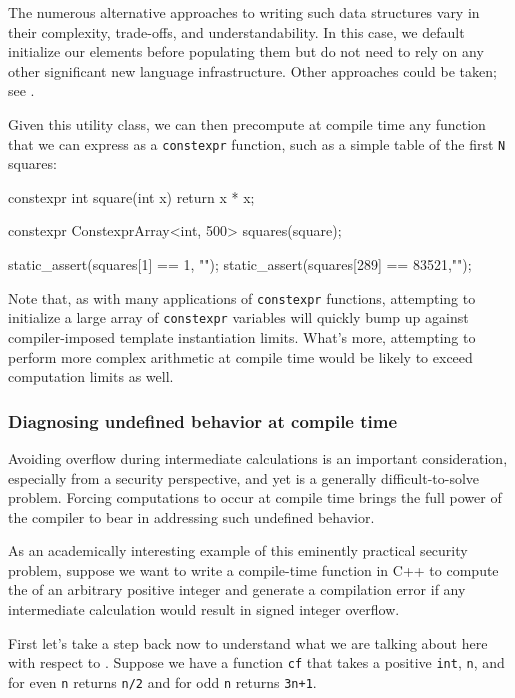 \noindent The numerous alternative approaches to writing such data structures
vary in their complexity, trade-offs, and understandability. In this
case, we default initialize our elements before populating them but do
not need to rely on any other significant new language infrastructure.
Other approaches could be taken; see .

Given this utility class, we can then precompute at compile time any
function that we can express as a \lstinline!constexpr! function, such as a
simple table of the first \lstinline!N! squares:

\begin{emcppslisting}[emcppsbatch=e3]
constexpr int square(int x) { return x * x; }

constexpr ConstexprArray<int, 500> squares(square);

static_assert(squares[1]   == 1,    "");
static_assert(squares[289] == 83521,"");
\end{emcppslisting}
    
\noindent Note that, as with many applications of \lstinline!constexpr! functions,
attempting to initialize a large array of \lstinline!constexpr! variables
will quickly bump up against compiler-imposed template instantiation
limits. What's more, attempting to perform more complex arithmetic at
compile time would be likely to exceed computation limits as well.

\subsubsection[Diagnosing undefined behavior at compile time]{Diagnosing undefined behavior at compile time}\label{diagnosing-undefined-behavior-at-compile-time}

Avoiding overflow during intermediate calculations is an important
consideration, especially from a security perspective, and yet is a
generally difficult-to-solve problem. Forcing computations to occur at
compile time brings the full power of the compiler to bear in addressing
such undefined behavior.

As an academically interesting example of this eminently practical
security problem, suppose we want to write a compile-time function in
C++ to compute the  of an arbitrary positive
integer and generate a compilation error if any intermediate calculation
would result in signed integer overflow.

First let's take a step back now to understand what we are talking about
here with respect to . Suppose we have a function
\lstinline!cf! that takes a positive \lstinline!int!, \lstinline!n!, and for even
\lstinline!n! returns \lstinline!n/2! and for odd \lstinline!n! returns
\lstinline!3n+1!.


